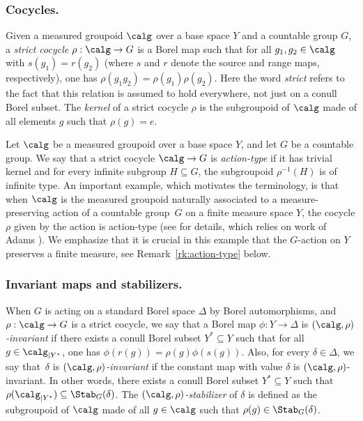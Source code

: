 \subsubsection*{Cocycles.} Given a measured groupoid $\calg$ over a base space $Y$ and a countable group $G$, a \emph{strict cocycle} $\rho:\calg\to G$ is a Borel map such that for all $g_1,g_2\in\calg$ with $s(g_1)=r(g_2)$ (where $s$ and $r$ denote the source and range maps, respectively), one has $\rho(g_1g_2)=\rho(g_1)\rho(g_2)$. Here the word \emph{strict} refers to the fact that this relation is assumed to hold everywhere, not just on a conull Borel subset. The \emph{kernel} of a strict cocycle $\rho$ is the subgroupoid of $\calg$ made of all elements $g$ such that $\rho(g)=e$.

Let $\calg$ be a measured groupoid over a base space $Y$, and let $G$ be a countable group. We say that a strict cocycle $\calg\to G$ is \emph{action-type} if it has trivial kernel and for every infinite subgroup $H\subseteq G$, the subgroupoid $\rho^{-1}(H)$ is of infinite type. An important example, which motivates the terminology, is that when $\calg$ is the measured groupoid naturally associated to a measure-preserving action of a countable group~$G$ on a finite measure space $Y$, the cocycle $\rho$ given by the action is action-type (see \cite[Prop.\,2.26]{Kid-survey} for details, which relies on work of Adams \cite{Ada}). We emphasize that it is crucial in this example that the $G$-action on $Y$ preserves a finite measure, see Remark~\ref{rk:action-type} below.

\subsubsection*{Invariant maps and stabilizers.} When $G$ is acting on a standard Borel space $\Delta$ by Borel automorphisms, and $\rho:\calg\to G$ is a strict cocycle, we say that a Borel map $\phi:Y\to\Delta$ is \emph{$(\calg,\rho)$-invariant} if there exists a conull Borel subset $Y^*\subseteq Y$ such that for all $g\in\calg_{|Y^*}$, one has $\phi(r(g))=\rho(g)\phi(s(g))$.
Also, for every $\delta\in\Delta$, we say that~$\delta$ is \emph{$(\calg,\rho)$-invariant} if the constant map with value $\delta$ is $(\calg,\rho)$-invariant. In other words, there exists a conull Borel subset $Y^*\subseteq Y$ such that $\rho(\calg_{|Y^*})\subseteq \Stab_G(\delta)$. The \emph{$(\calg,\rho)$-stabilizer} of $\delta$ is defined as the subgroupoid of $\calg$ made of all $g\in\calg$ such that $\rho(g)\in\Stab_G(\delta)$.

